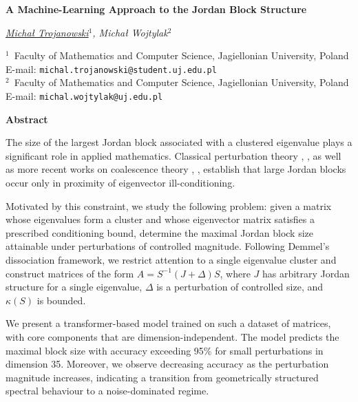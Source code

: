 \documentclass[10pt,a4paper]{article}
\newcommand{\titlesize}{\fontsize{18}{20pt}\bfseries}
\newcommand{\titulo}[1]{\vspace*{10pt}\begin{center}
               \titlesize{#1}\par\vspace*{10pt}\large}
\newcommand{\autor}[1]{\vspace*{12pt}\sl{#1}\par}
\def\affilnum#1{${}^{#1}$}
\def\affil#1{${}^{#1}$}
\newcommand{\address}[1]{\vspace*{10pt}\footnotesize
                \textrm{#1}\end{center}\par\vspace*{20pt}}
\begin{document}
\titulo
{A Machine-Learning Approach to the %
Jordan Block Structure %
}

\autor
{\underline{Michał Trojanowski}\affil{1}, Michał Wojtylak\affil{2}}

\address
{\affilnum{1}\ Faculty of Mathematics and Computer Science, Jagiellonian University, Poland\\
E-mail: {\tt michal.trojanowski@student.uj.edu.pl\qquad} \\
 \affilnum{2}\ Faculty of Mathematics and Computer Science, Jagiellonian University, Poland\\
E-mail: {\tt michal.wojtylak@uj.edu.pl\qquad} }


\begin{center}
{\bf \large Abstract}
\end{center}

The size of the largest Jordan block associated with a clustered eigenvalue plays a significant role in applied mathematics. Classical perturbation theory \cite{wilkinson1965}, \cite{Demmel1983}, as well as more recent works on coalescence theory \cite{Alam2011}, \cite{Banks2021}, establish that large Jordan blocks occur only in  proximity of eigenvector ill-conditioning. %

Motivated by this constraint, we study the following problem: given a matrix whose eigenvalues form a cluster and whose eigenvector matrix satisfies a prescribed conditioning bound, determine the maximal Jordan block size attainable under perturbations of controlled magnitude. Following Demmel's dissociation framework, we restrict attention to a single eigenvalue cluster and construct matrices of the form $ A = S^{-1} (J+\Delta) S$, where $J$ has arbitrary Jordan structure for a single eigenvalue, $\Delta$ is a perturbation of controlled size, and $\kappa(S)$ is bounded.

We present a transformer-based model trained on such a dataset of matrices, with core components that are dimension-independent. The model predicts the maximal block size with accuracy exceeding 95\% for small perturbations in dimension 35. Moreover, we observe decreasing accuracy as the perturbation magnitude increases, indicating a transition from geometrically structured spectral behaviour to a noise-dominated regime.
\end{document}
